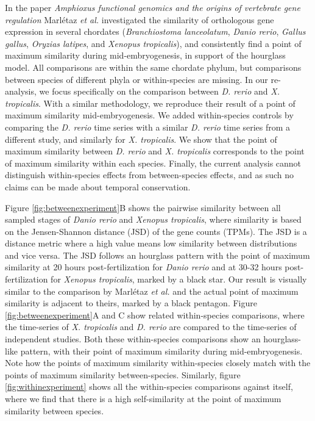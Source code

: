 In the paper \textit{Amphioxus functional genomics and the origins of vertebrate gene regulation}\cite{marletaz2018} Marl\'etaz \textit{et al.} investigated the similarity of orthologous gene expression in several chordates (\textit{Branchiostoma lanceolatum}, \textit{Danio rerio}, \textit{Gallus gallus}, \textit{Oryzias latipes}, and \textit{Xenopus tropicalis}), and consistently find a point of maximum similarity during mid-embryogenesis, in support of the hourglass model. All comparisons are within the same chordate phylum, but comparisons between species of different phyla or within-species are missing. In our re-analysis, we focus specifically on the comparison between \textit{D. rerio} and \textit{X. tropicalis}. With a similar methodology, we reproduce their result of a point of maximum similarity mid-embryogenesis. We added within-species controls by comparing the \textit{D. rerio} time series with a similar \textit{D. rerio} time series from a different study, and similarly for \textit{X. tropicalis}. We show that the point of maximum similarity between \textit{D. rerio} and \textit{X. tropicalis} corresponds to the point of maximum similarity within each species. Finally, the current analysis cannot distinguish within-species effects from between-species effects, and as such no claims can be made about temporal conservation.

Figure \ref{fig:betweenexperiment}B shows the pairwise similarity between all sampled stages of \textit{Danio rerio} and \textit{Xenopus tropicalis}, where similarity is based on the Jensen-Shannon distance (JSD) of the gene counts (TPMs). The JSD is a distance metric where a high value means low similarity between distributions and vice versa. The JSD follows an hourglass pattern with the point of maximum similarity at 20 hours post-fertilization for \textit{Danio rerio} and at 30-32 hours post-fertilization for \textit{Xenopus tropicalis}, marked by a black star. Our result is visually similar to the comparison by Marl\'etaz \textit{et al.} and the actual point of maximum similarity is adjacent to theirs, marked by a black pentagon. Figure \ref{fig:betweenexperiment}A and C show related within-species comparisons, where the time-series of \textit{X. tropicalis} and \textit{D. rerio} are compared to the time-series of independent studies\cite{Hu2017,White2017}. Both these within-species comparisons show an hourglass-like pattern, with their point of maximum similarity during mid-embryogenesis. Note how the points of maximum similarity within-species closely match with the points of maximum similarity between-species. Similarly, figure \ref{fig:withinexperiment} shows all the within-species comparisons against itself, where we find that there is a high self-similarity at the point of maximum similarity between species. 

